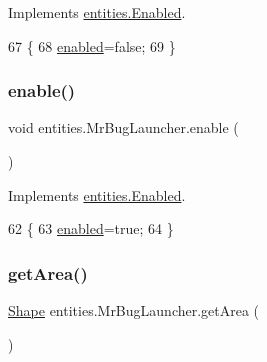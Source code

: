 Implements \mbox{\hyperlink{interfaceentities_1_1_enabled_a1aad7d7176a83876b92f54e2b31fa1e4}{entities.\+Enabled}}.


\begin{DoxyCode}
67                           \{
68         \mbox{\hyperlink{classentities_1_1_mr_bug_launcher_a7a137e2093be1b7ebc830d8c10db42b1}{enabled}}=\textcolor{keyword}{false};
69     \}
\end{DoxyCode}
\mbox{\label{classentities_1_1_mr_bug_launcher_a5ed27f4fcd413382a04c839e90e5e493}} 
\subsubsection{\texorpdfstring{enable()}{enable()}}
{\footnotesize\ttfamily void entities.\+Mr\+Bug\+Launcher.\+enable (\begin{DoxyParamCaption}{ }\end{DoxyParamCaption})\hspace{0.3cm}{\ttfamily [inline]}}



Implements \mbox{\hyperlink{interfaceentities_1_1_enabled_a0c6a44be8f9b87d4e0ddf93dad67232a}{entities.\+Enabled}}.


\begin{DoxyCode}
62                          \{
63         \mbox{\hyperlink{classentities_1_1_mr_bug_launcher_a7a137e2093be1b7ebc830d8c10db42b1}{enabled}}=\textcolor{keyword}{true};
64     \}
\end{DoxyCode}
\mbox{\label{classentities_1_1_mr_bug_launcher_a088ee997aa4bd9c04748b6339b682391}} 
\subsubsection{\texorpdfstring{get\+Area()}{getArea()}}
{\footnotesize\ttfamily \mbox{\hyperlink{classorg_1_1newdawn_1_1slick_1_1geom_1_1_shape}{Shape}} entities.\+Mr\+Bug\+Launcher.\+get\+Area (\begin{DoxyParamCaption}{ }\end{DoxyParamCaption})\hspace{0.3cm}{\ttfamily [inline]}}



